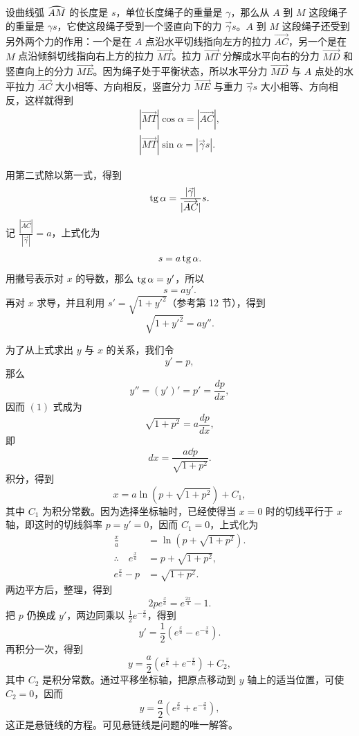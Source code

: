 \noindent 设曲线弧 $\arc{AM}$ 的长度是 $s$，单位长度绳子的重量是 $\gamma$，那么从 $A$ 到 $M$ 这段绳子的重量是 $\gamma s$，它使这段绳子受到一个竖直向下的力 $\vec{\gamma} s$。$A$ 到 $M$ 这段绳子还受到另外两个力的作用：一个是在 $A$ 点沿水平切线指向左方的拉力 $\overrightarrow{AC}$，另一个是在 $M$ 点沿倾斜切线指向右上方的拉力 $\overrightarrow{MT}$。拉力 $\overrightarrow{MT}$ 分解成水平向右的分力 $\overrightarrow{MD}$ 和竖直向上的分力 $\overrightarrow{ME}$。因为绳子处于平衡状态，所以水平分力 $\overrightarrow{MD}$ 与 $A$ 点处的水平拉力 $\overrightarrow{AC}$ 大小相等、方向相反，竖直分力 $\overrightarrow{ME}$ 与重力 $\vec{\gamma} s$ 大小相等、方向相反，这样就得到
\begin{gather*}
  |\overrightarrow{MT}|\cos\alpha = |\overrightarrow{AC}|, \\
  |\overrightarrow{MT}|\sin\alpha = |\vec{\gamma} s|.
\end{gather*}

用第二式除以第一式，得到
\[
  \operatorname{tg}\alpha = \frac{|\vec{\gamma}|}{|\overrightarrow{AC}|} s.
\]
记 $\frac{|\overrightarrow{AC}|}{|\vec{\gamma}|} = a$，上式化为
\[
  s = a \operatorname{tg}\alpha.
\]
用撇号表示对 $x$ 的导数，那么 $\operatorname{tg}\alpha = y'$，所以
\[
  s = a y'.
\]
再对 $x$ 求导，并且利用 $s' = \sqrt{1 + y'^2}$（参考第 12 节），得到
\begin{equation*}
  \sqrt{1 + y'^2} = a y''. \tag{1}
\end{equation*}

为了从上式求出 $y$ 与 $x$ 的关系，我们令
\[
  y' = p,
\]
那么
\[
  y'' = (y')' = p' = \frac{dp}{dx},
\]
因而 $(1)$ 式成为
\[
  \sqrt{1 + p^2} = a \frac{dp}{dx},
\]
即
\[
  dx = \frac{a \dd p}{\sqrt{1 + p^2}}.
\]
积分，得到
\[
  x = a \ln\left(p + \sqrt{1 + p^2}\right) + C_1,
\]
其中 $C_1$ 为积分常数。因为选择坐标轴时，已经使得当 $x = 0$ 时的切线平行于 $x$ 轴，即这时的切线斜率 $p = y' = 0$，因而 $C_1 = 0$，上式化为
\begin{align*}
  \frac{x}{a} &= \ln\left(p + \sqrt{1 + p^2}\right). \\
  \therefore\quad e^{\frac{x}{a}} &= p + \sqrt{1 + p^2}, \\
  e^{\frac{x}{a}} - p &= \sqrt{1 + p^2}.
\end{align*}
两边平方后，整理，得到
\[
  2p e^{\frac{x}{a}} = e^{\frac{2x}{a}} - 1.
\]
把 $p$ 仍换成 $y'$，两边同乘以 $\frac{1}{2} e^{-\frac{x}{a}}$，得到
\[
  y' = \frac{1}{2}\left(e^{\frac{x}{a}} - e^{-\frac{x}{a}}\right).
\]
再积分一次，得到
\[
  y = \frac{a}{2}\left(e^{\frac{x}{a}} + e^{-\frac{x}{a}}\right) + C_2,
\]
其中 $C_2$ 是积分常数。通过平移坐标轴，把原点移动到 $y$ 轴上的适当位置，可使 $C_2 = 0$，因而
\[
  y = \frac{a}{2}\left(e^{\frac{x}{a}} + e^{-\frac{x}{a}}\right),
\]
这正是悬链线的方程。可见悬链线是问题的唯一解答。
